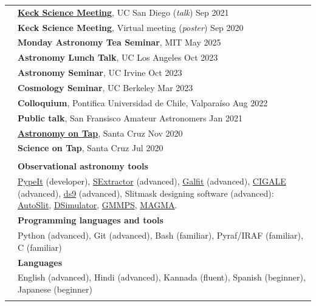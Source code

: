 \documentclass[letterpaper, 11pt]{article}
\begin{document}
\begin{longtable}{p{1.3in}p{4.8in}}
& \href{https://www.youtube.com/watch?v=EM-5nxv6BSU&list=PLOydScKsZ5XHWcd6q7-LTfBboPUh3SQz_&index=13}{\textbf{Keck Science Meeting}}, UC San Diego (\textit{talk}) \hfill Sep 2021 \\
& \textbf{Keck Science Meeting}, Virtual meeting (\textit{poster}) \hfill Sep 2020 \\
{\color{OliveGreen}{Other Talks}}
 & \textbf{Monday Astronomy Tea Seminar}, MIT \hfill May 2025 \\
 & \textbf{Astronomy Lunch Talk}, UC Los Angeles \hfill Oct 2023 \\
 & \textbf{Astronomy Seminar}, UC Irvine \hfill Oct 2023 \\
 & \textbf{Cosmology Seminar}, UC Berkeley \hfill Mar 2023 \\
 & \textbf{Colloquium}, Pontifica Universidad de Chile, Valpara\'iso \hfill Aug 2022 \\
 & \textbf{Public talk}, San Fransisco Amateur Astronomers \hfill Jan 2021\\
 & \href{https://www.youtube.com/watch?v=1MLDxRQZlzA}{\textbf{Astronomy on Tap}}, Santa Cruz \hfill Nov 2020 \\
 & \textbf{Science on Tap}, Santa Cruz \hfill Jul 2020\\
 \hline
 &\\
 
{\color{OliveGreen}{Skills}} 
& \textbf{Observational astronomy tools}\\
& \href{https://pypeit.readthedocs.io/en/release/}{PypeIt} (developer), \href{https://sextractor.readthedocs.io/en/latest/}{SExtractor} (advanced), \href{https://users.obs.carnegiescience.edu/peng/work/galfit/galfit.html}{Galfit} (advanced), \href{https://cigale.lam.fr/}{CIGALE} (advanced), \href{https://sites.google.com/cfa.harvard.edu/saoimageds9/about?authuser=0}{ds9} (advanced), Slitmask designing software (advanced): \href{https://www2.keck.hawaii.edu/inst/lris/autoslit_WMKO.html}{AutoSlit}, \href{https://www2.keck.hawaii.edu/inst/deimos/dsim.html}{DSimulator}, \href{https://gmmps-documentation.readthedocs.io/en/latest/}{GMMPS}, \href{https://www2.keck.hawaii.edu/inst/mosfire/magma.html}{MAGMA}.\\
& \textbf{Programming languages and tools}\\
& Python (advanced), Git (advanced), Bash (familiar), Pyraf/IRAF (familiar), C (familiar)\\

& \textbf{Languages} \\
& English (advanced), Hindi (advanced), Kannada (fluent), Spanish (beginner), Japanese (beginner) \\
\hline
& \\


\end{longtable}
\end{document}
